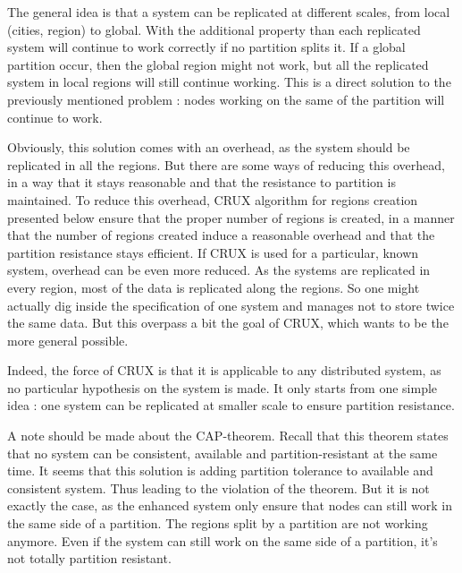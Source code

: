 \documentclass[a4paper,11pt,oneside]{report}
\begin{document}
The general idea is that a system can be replicated at different scales, from
local (cities, region) to global.  With the additional property than each
replicated system will continue to work correctly if no partition splits it. If
a global partition occur, then the global region might not work, but all the
replicated system in local regions will still continue working. This is a
direct solution to the previously mentioned problem : nodes working on the same
of the partition will continue to work.

Obviously, this solution comes with an overhead, as the system should be
replicated in all the regions. But there are some ways of reducing this
overhead, in a way that it stays reasonable and that the resistance to
partition is maintained. To reduce this overhead, CRUX algorithm for regions
creation presented below ensure that the proper number of regions is created,
in a manner that the number of regions created induce a reasonable overhead and
that the partition resistance stays efficient. If CRUX is used for a
particular, known system, overhead can be even more reduced.  As the systems
are replicated in every region, most of the data is replicated along the
regions. So one might actually dig inside the specification of one system and
manages not to store twice the same data. But this overpass a bit the goal of
CRUX, which wants to be the more general possible. 

Indeed, the force of CRUX is that it is applicable to any distributed system,
as no particular hypothesis on the system is made. It only starts from one
simple idea : one system can be replicated at smaller scale to ensure partition
resistance. 

A note should be made about the CAP-theorem. Recall that this theorem states
that no system can be consistent, available and partition-resistant at the same
time. It seems that this solution is adding partition tolerance to available
and consistent system. Thus leading to the violation of the theorem. But it is
not exactly the case, as the enhanced system only ensure that nodes can still
work in the same side of a partition. The regions split by a partition are
not working anymore. Even if the system can still work on the same side of a
partition, it's not totally partition resistant.

\end{document}
